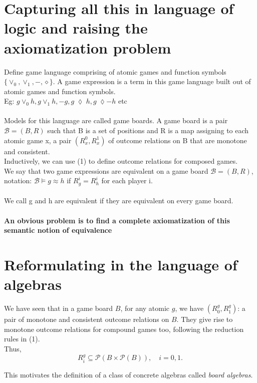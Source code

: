 \documentclass[12pt]{article}
\begin{document}
\section{Capturing all this in language of logic and raising the axiomatization problem}
Define game language comprising of atomic games and function symbols $\{\vee_{0},\vee_{1},-,\diamond\}$. A game expression is a term in this game language built out of atomic games and function symbols. \\
Eg: $g \vee_{0}h, g \vee_{1} h, -g, g\; \lozenge \; h, g\; \lozenge -h$ etc \\ \\
Models for this language are called game boards. A game board is a pair $\mathcal{B}=(B,R)$ such that B is a set of positions and R is a map assigning to each atomic game x, a pair $(R^{0}_{x}, R^{1}_{x})$ of outcome relations on B that are monotone and consistent. \\
Inductively, we can use (1) to define outcome relations for composed games. \\
We say that two game expressions are equivalent on a game board $\mathcal{B}=(B,R)$, notation: $\mathcal{B} \vDash g \approx h$ if $R^{i}_{g}=R^{i}_{h}$ for each player i. \\ \\
We call g and h are equivalent if they are equivalent on every game board. \\ \\
\textbf{An obvious problem is to find a complete axiomatization of this semantic notion of equivalence}
\section{Reformulating in the language of algebras}
We have seen that in a game board $B$, for any atomic $g$, we have 
$(R^g_0, R^g_1)$: a pair of monotone and consistent outcome relations on $B$. 
They give rise to monotone outcome relations for compound games too, 
following the reduction rules in (1).\\
Thus,
\[
R^g_i \subseteq \mathcal{P}(B \times \mathcal{P}(B)), \quad i = 0,1.
\]

This motivates the definition of a class of concrete algebras 
called \emph{board algebras}.
\end{document}
